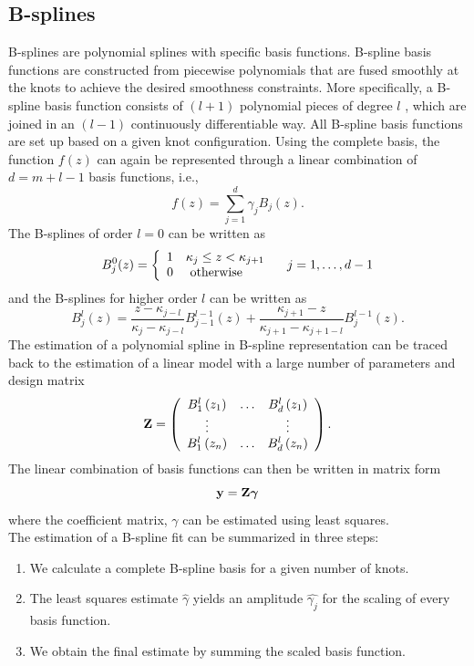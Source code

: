 \subsection{B-splines}
B-splines are polynomial splines with specific basis functions. B-spline basis functions are constructed
from piecewise polynomials that are fused smoothly at the knots to achieve the desired smoothness constraints. More specifically, a B-spline basis function consists
of $(l+1)$ polynomial pieces of degree $l$ , which are joined in an $(l-1)$ continuously differentiable way. All B-spline basis functions are set up based on a given knot configuration. Using the complete basis, the function $f(z)$ can again be represented through a linear combination of $d = m + l-1$ basis
functions, i.e.,
\[f ( z ) = \sum _ { j = 1 } ^ { d } \gamma _ { j } B _ { j } ( z )\text{.}\]
The B-splines of order $l=0$ can be written as
\[B _ { j } ^ { 0 } ( z ) = \left\{ \begin{array} { l l } { 1 } & { \kappa _ { j } \leq z < \kappa _ { j + 1 } } \\ { 0 } & { \text { otherwise } } \end{array} \right. \quad j = 1 , \ldots , d - 1\]
and the B-splines for higher order $l$ can be written as
\[B _ { j } ^ { l } ( z ) = \frac { z - \kappa _ { j - l } } { \kappa _ { j } - \kappa _ { j - l } } B _ { j - 1 } ^ { l - 1 } ( z ) + \frac { \kappa _ { j + 1 } - z } { \kappa _ { j + 1 } - \kappa _ { j + 1 - l } } B _ { j } ^ { l - 1 } ( z ) \text{.}\]
The estimation of a polynomial spline in B-spline representation can be traced back to the estimation of a linear model with a large number of parameters and design matrix 
\[\mathbf{Z}= \left( \begin{array} { c c c } { B _ { 1 } ^ { l } \left( z _ { 1 } \right) } & { \dots } & { B _ { d } ^ { l } \left( z _ { 1 } \right) } \\ { \vdots } & { } & { \vdots } \\ { B _ { 1 } ^ { l } \left( z _ { n } \right) } & { \dots } & { B _ { d } ^ { l } \left( z _ { n } \right) } \end{array} \right) \text{.} \]
The linear combination of basis functions can then be written in matrix form
\[ \mathbf{y} = \mathbf{Z} \mbox{\boldmath$\gamma$} \]
where the coefficient matrix, {\boldmath$\gamma$} can be estimated using least squares.\\
The estimation of a B-spline fit can be summarized in three steps:
\begin{enumerate}
\item We calculate a complete B-spline basis for a given number of knots.
\item The least squares estimate {\boldmath$\hat{\gamma}$} yields an amplitude $\hat{\gamma_j}$ for the scaling of every basis function.
\item We obtain the final estimate by summing the scaled basis function.
\end{enumerate}


